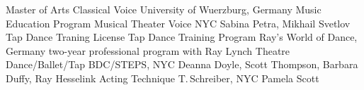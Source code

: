 \begin{cventries}
  \cventrytab
    {Master of Arts}
    {Classical Voice}
    {University of Wuerzburg, Germany}
    {Music Education Program}
 \cventrytab
    {}
    {Musical Theater Voice}
    {NYC}
    {Sabina Petra, Mikhail Svetlov}
    \cventrytab
      {Tap Dance Traning License}
      {Tap Dance Training Program}
      {Ray's World of Dance, Germany}
      {two-year professional program with Ray Lynch}
    \cventrytab
      {}
      {Theatre Dance/Ballet/Tap}
      {BDC/STEPS, NYC}
      {Deanna Doyle, Scott Thompson, Barbara Duffy, Ray Hesselink}
    \cventrytab
      {}
      {Acting Technique}
      {T.\,Schreiber, NYC}
      {Pamela Scott}
\end{cventries}
